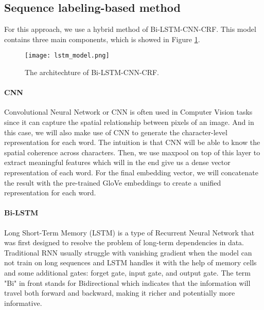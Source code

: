 \documentclass[conference]{IEEEtran}
\begin{document}
\vspace{3mm}
\subsection{Sequence labeling-based method}
For this approach, we use a hybrid method of Bi-LSTM-CNN-CRF\cite{ma-hovy-2016-end}.
This model contains three main components, which is showed in Figure \ref{fig6}.  

\begin{figure}
    \centering
    \texttt{[image: lstm\_model.png]}
    \caption{The architechture of Bi-LSTM-CNN-CRF.}
    \label{fig6}
\end{figure}

\paragraph{CNN} Convolutional Neural Network or CNN is often used in Computer Vision
tasks since it can capture the spatial relationship between pixels of an image. And in
this case, we will also make use of CNN to generate the character-level representation
for each word. The intuition is that CNN will be able to know the spatial coherence
across characters. Then, we use maxpool on top of this layer to extract meaningful
features which will in the end give us a dense vector representation of each word. For
the final embedding vector, we will concatenate the result with the pre-trained GloVe
embeddings to create a unified representation for each word.

\paragraph{Bi-LSTM} Long Short-Term Memory (LSTM) is a type of Recurrent Neural Network
that was first designed to resolve the problem of long-term dependencies in data.
Traditional RNN usually struggle with vanishing gradient when the model can not train
on long sequences and LSTM handles it with the help of memory cells and some additional
gates: forget gate, input gate, and output gate. The term "Bi" in front stands for
Bidirectional which indicates that the information will travel both forward and
backward, making it richer and potentially more informative.
\end{document}
